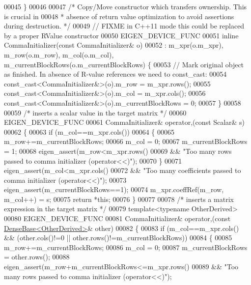 \begin{DoxyCode}
00045   \}
00046 
00047   \textcolor{comment}{/* Copy/Move constructor which transfers ownership. This is crucial in }
00048 \textcolor{comment}{   * absence of return value optimization to avoid assertions during destruction. */}
00049   \textcolor{comment}{// FIXME in C++11 mode this could be replaced by a proper RValue constructor}
00050   EIGEN\_DEVICE\_FUNC
00051   \textcolor{keyword}{inline} CommaInitializer(\textcolor{keyword}{const} CommaInitializer& o)
00052   : m\_xpr(o.m\_xpr), m\_row(o.m\_row), m\_col(o.m\_col), m\_currentBlockRows(o.m\_currentBlockRows) \{
00053     \textcolor{comment}{// Mark original object as finished. In absence of R-value references we need to const\_cast:}
00054     \textcolor{keyword}{const\_cast<}CommaInitializer&\textcolor{keyword}{>}(o).m\_row = m\_xpr.rows();
00055     \textcolor{keyword}{const\_cast<}CommaInitializer&\textcolor{keyword}{>}(o).m\_col = m\_xpr.cols();
00056     \textcolor{keyword}{const\_cast<}CommaInitializer&\textcolor{keyword}{>}(o).m\_currentBlockRows = 0;
00057   \}
00058 
00059   \textcolor{comment}{/* inserts a scalar value in the target matrix */}
00060   EIGEN\_DEVICE\_FUNC
00061   CommaInitializer& operator,(\textcolor{keyword}{const} Scalar& s)
00062   \{
00063     \textcolor{keywordflow}{if} (m\_col==m\_xpr.cols())
00064     \{
00065       m\_row+=m\_currentBlockRows;
00066       m\_col = 0;
00067       m\_currentBlockRows = 1;
00068       eigen\_assert(m\_row<m\_xpr.rows()
00069         && \textcolor{stringliteral}{"Too many rows passed to comma initializer (operator<<)"});
00070     \}
00071     eigen\_assert(m\_col<m\_xpr.cols()
00072       && \textcolor{stringliteral}{"Too many coefficients passed to comma initializer (operator<<)"});
00073     eigen\_assert(m\_currentBlockRows==1);
00074     m\_xpr.coeffRef(m\_row, m\_col++) = s;
00075     \textcolor{keywordflow}{return} *\textcolor{keyword}{this};
00076   \}
00077 
00078   \textcolor{comment}{/* inserts a matrix expression in the target matrix */}
00079   \textcolor{keyword}{template}<\textcolor{keyword}{typename} OtherDerived>
00080   EIGEN\_DEVICE\_FUNC
00081   CommaInitializer& operator,(\textcolor{keyword}{const} \hyperlink{group___core___module_class_eigen_1_1_dense_base}{DenseBase<OtherDerived>}& other)
00082   \{
00083     \textcolor{keywordflow}{if} (m\_col==m\_xpr.cols() && (other.cols()!=0 || other.rows()!=m\_currentBlockRows))
00084     \{
00085       m\_row+=m\_currentBlockRows;
00086       m\_col = 0;
00087       m\_currentBlockRows = other.rows();
00088       eigen\_assert(m\_row+m\_currentBlockRows<=m\_xpr.rows()
00089         && \textcolor{stringliteral}{"Too many rows passed to comma initializer (operator<<)"});

\end{DoxyCode}
